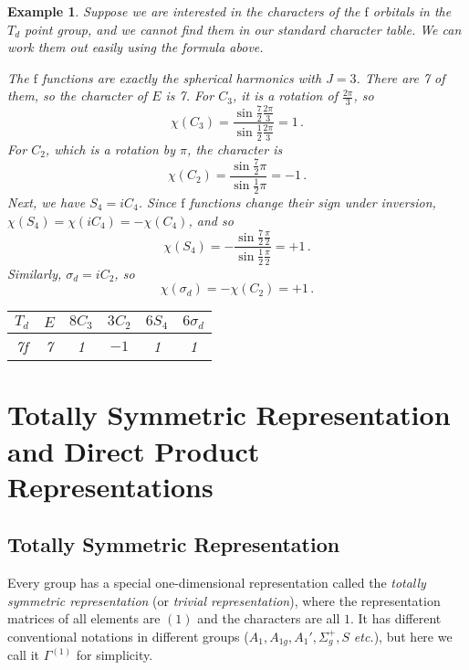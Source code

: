 \documentclass{article}
\theoremstyle{plain}\theoremheaderfont{\normalfont\itshape}\theorembodyfont{\rmfamily}\theoremseparator{.}\newtheorem*{rem}{Remark}\newtheorem*{ex}{Example}\newtheorem*{proof}{Proof}\newtheorem*{altp}{Alternative proof}
\theoremstyle{plain}\theoremheaderfont{\normalfont\bfseries}\theorembodyfont{\rmfamily}\theoremseparator{.}\newtheorem{thm}{Theorem}[section]\newtheorem{lem}[thm]{Lemma}\newtheorem{prop}[thm]{Proposition}\newtheorem*{cor}{Corollary}\newtheorem{defn}[thm]{Definition}\newtheorem{clm}[thm]{Claim}\newtheorem{clminproof}{Claim}\newtheorem*{law}{Law}\newtheorem{pos}[thm]{Postulate}
\theoremstyle{break}\theoremheaderfont{\normalfont\itshape}\theorembodyfont{\rmfamily}\theoremseparator{.\medskip}\newtheorem*{proofskip}{Proof}\newtheorem*{exs}{Examples}\newtheorem*{rems}{Remarks}
\theoremstyle{break}\theoremheaderfont{\normalfont\bfseries}\theorembodyfont{\rmfamily}\theoremseparator{.\medskip}\newtheorem{lemskip}[thm]{Lemma}\newtheorem{defnskip}[thm]{Definition}\newtheorem{propskip}[thm]{Proposition}\newtheorem{thmskip}[thm]{Theorem}
\numberwithin{equation}{section}
\begin{document}
    \begin{ex}
        Suppose we are interested in the characters of the \(\mathrm{f}\) orbitals in the \(T_d\) point group, and we cannot find them in our standard character table. We can work them out easily using the formula above.

        The \(\mathrm{f}\) functions are exactly the spherical harmonics with \(J=3\). There are 7 of them, so the character of \(E\) is 7. For \(C_3\), it is a rotation of \(\frac{2\pi}{3}\), so
        \begin{equation}
            \chi(C_3)=\frac{\sin\frac{7}{2}\frac{2\pi}{3}}{\sin\frac{1}{2}\frac{2\pi}{3}}=1\,.
        \end{equation}
        For \(C_2\), which is a rotation by \(\pi\), the character is
        \begin{equation}
            \chi(C_2)=\frac{\sin\frac{7}{2}\pi}{\sin\frac{1}{2}\pi}=-1\,.
        \end{equation}
        Next, we have \(S_4=iC_4\). Since \(\mathrm{f}\) functions change their sign under inversion, \(\chi(S_4)=\chi(iC_4)=-\chi(C_4)\), and so
        \begin{equation}
            \chi(S_4)=-\frac{\sin\frac{7}{2}\frac{\pi}{2}}{\sin\frac{1}{2}\frac{\pi}{2}}=+1\,.
        \end{equation}
        Similarly, \(\sigma_d=iC_2\), so
        \begin{equation}
            \chi(\sigma_d)=-\chi(C_2)=+1\,.
        \end{equation}

        \begin{table}[ht!]
            \centering
            \begin{tabular}{cccccc}
                \toprule
                \(T_d\) & \(E\) & \(8C_3\) & \(3C_2\) & \(6S_4\) & \(6\sigma_d\) \\ \midrule
                7f & 7 & 1 & \(-1\) & 1 & 1 \\ \bottomrule
            \end{tabular}
        \end{table}
    \end{ex}

    \newpage
    \section{Totally Symmetric Representation and Direct Product Representations}
    \subsection{Totally Symmetric Representation}
    Every group has a special one-dimensional representation called the \textit{totally symmetric representation} (or \textit{trivial representation}), where the representation matrices of all elements are \((1)\) and the characters are all \(1\). It has different conventional notations in different groups (\(A_1,A_{1g},A_1',\Sigma_g^{+},S\) \textit{etc.}), but here we call it \(\Gamma^{(1)}\) for simplicity.
\end{document}
